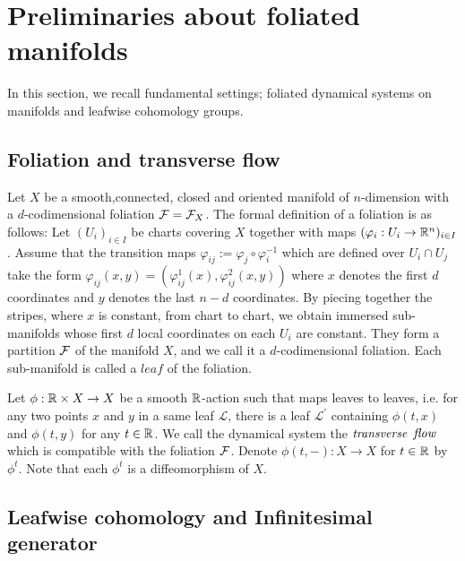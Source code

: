 \section{Preliminaries about foliated manifolds}\label{section1}
In this section, we recall fundamental settings; foliated dynamical systems on manifolds and leafwise cohomology groups.

\subsection{Foliation and transverse flow}

Let $X$ be a smooth,connected, closed and oriented manifold of $n$-dimension with a $d$-codimensional foliation ${\mathcal{F}}={\mathcal{F}}_{X}$. 
The formal definition of a foliation is as follows: Let $(U_{i})_{i\in{I}}$ be charts covering $X$ together with maps $(\varphi_{i}:U_{i}\rightarrow{\mathbb{R}}^{n})_{i\in{I}}$.
Assume that the transition maps $\varphi_{ij}:=\varphi_{j} \circ \varphi_{i}^{-1}$ which are defined over $U_{i}\cap U_{j}$ take the form $\varphi_{ij}(x,y)=(\varphi_{ij}^{1}(x),\varphi_{ij}^{2}(x,y))$ where $x$ denotes the first $d$ coordinates and $y$ denotes the last $n-d$ coordinates.
By piecing together the stripes, where $x$ is constant, from chart to chart, we obtain immersed sub-manifolds whose first $d$ local coordinates on each $U_{i}$ are constant.
They form a partition ${\mathcal{F}}$ of the manifold $X$, and we call it a $d$-codimensional foliation.
Each sub-manifold is called a $\mathit{leaf}$ of the foliation.


Let $\phi:{\mathbb{R}}\times{X}\rightarrow{X}$ be a smooth ${\mathbb{R}}$-action such that maps leaves to leaves, i.e. for any two points $x$ and $y$ in a same leaf $\mathcal{L}$, there is a leaf $\mathcal{L}^{\prime}$ containing $\phi(t,x)$ and $\phi(t,y)$ for any $t\in{\mathbb{R}}$. 
We call the dynamical system the $\it{transverse}$ $\it{flow}$ which is compatible with the foliation ${\mathcal{F}}$. Denote $\phi(t,-):X\rightarrow{X}$ for $t\in{\mathbb{R}}$ by $\phi^{t}$. Note that each $\phi^{t}$ is a diffeomorphism of $X$.


\subsection{Leafwise cohomology and Infinitesimal generator}

